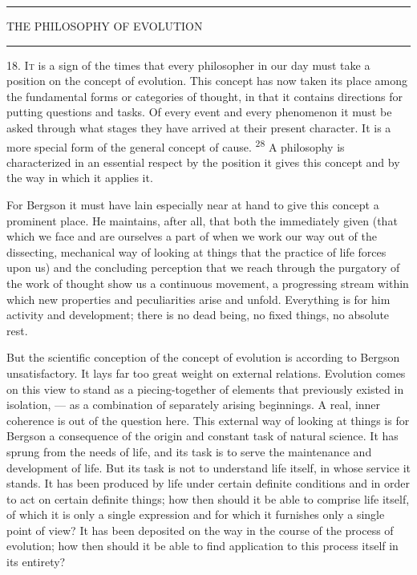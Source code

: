 \documentclass[12pt,a4paper,openany]{book}
\newcommand{\opage}[1]{\marginnote{\footnotesize\textit{[#1]}}}
\newcommand{\chapterhead}[1]{\clearpage\phantomsection\addcontentsline{toc}{chapter}{#1}\vspace*{3cm}\begin{center}{\large #1}\\[6pt]\rule{1.2cm}{0.4pt}\end{center}\medskip}
\newcommand{\initial}[2]{{\Large #1}\textsc{#2}}
\newcommand{\chapterend}{\par\begin{center}\rule{2.5cm}{0.4pt}\end{center}}
\newcommand{\nm}[1]{\unskip\textsuperscript{#1}}
\begin{document}
\chapterend

\chapterhead{THE PHILOSOPHY OF EVOLUTION}

\opage{35}18. \initial{I}{t} is a sign of the times that every philosopher in our day must take a position on the concept of evolution. This concept has now taken its place among the fundamental forms or categories of thought, in that it contains directions for putting questions and tasks. Of every event and every phenomenon it must be asked through what stages they have arrived at their present character. It is a more special form of the general concept of cause. \nm{28} A philosophy is characterized in an essential respect by the position it gives this concept and by the way in which it applies it.

For Bergson it must have lain especially near at hand to give this concept a prominent place. He maintains, after all, that both the immediately given (that which we face and are ourselves a part of when we work our way out of the dissecting, mechanical way of looking at things that the practice of life forces upon us) and the concluding perception that we reach through the purgatory of the work of thought show us a continuous movement, a progressing stream within which new properties and peculiarities arise and unfold. Everything is for him activity and development; there is no dead being, no fixed things, no absolute rest.

But the scientific conception of the concept of evolution is according to Bergson unsatisfactory. It lays far too great weight on external relations. Evolution comes on this view to stand as a piecing-together of elements that previously existed in isolation, --- as a combination of separately arising beginnings. A real, inner coherence is out of the question here.
\opage{36}This external way of looking at things is for Bergson a consequence of the origin and constant task of natural science. It has sprung from the needs of life, and its task is to serve the maintenance and development of life. But its task is not to understand life itself, in whose service it stands. It has been produced by life under certain definite conditions and in order to act on certain definite things; how then should it be able to comprise life itself, of which it is only a single expression and for which it furnishes only a single point of view? It has been deposited on the way in the course of the process of evolution; how then should it be able to find application to this process itself in its entirety?
\end{document}
